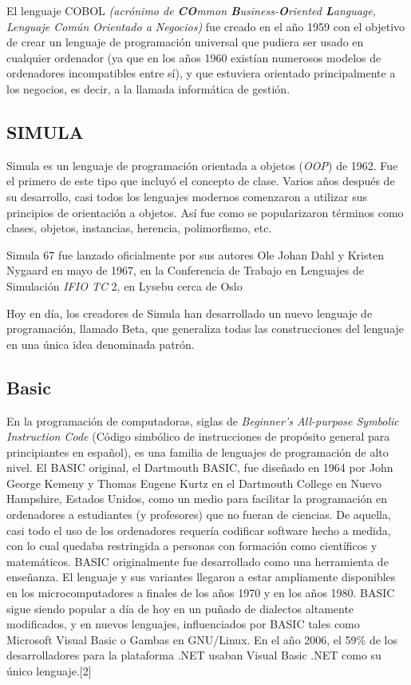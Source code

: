 \documentclass[twoside,twocolumn]{article}
\begin{document}
El lenguaje COBOL \textit{(acrónimo de \textbf{CO}mmon \textbf{B}usiness-\textbf{O}riented \textbf{L}anguage, Lenguaje Común Orientado a Negocios)} fue creado en el año 1959 con el objetivo de crear un lenguaje de programación universal que pudiera ser usado en cualquier ordenador (ya que en los años 1960 existían numerosos modelos de ordenadores incompatibles entre sí), y que estuviera orientado principalmente a los negocios, es decir, a la llamada informática de gestión.

\subsection{SIMULA}

Simula es un lenguaje de programación orientada a objetos (\textit{OOP}) de 1962. Fue el primero de este tipo que incluyó el concepto de clase. Varios años después de su desarrollo, casi todos los lenguajes modernos comenzaron a utilizar sus principios de orientación a objetos. Así fue como se popularizaron términos como clases, objetos, instancias, herencia, polimorfismo, etc.

Simula 67 fue lanzado oficialmente por sus autores Ole Johan Dahl y Kristen Nygaard en mayo de 1967, en la Conferencia de Trabajo en Lenguajes de Simulación \textit{IFIO TC }2, en Lysebu cerca de Oslo

Hoy en día, los creadores de Simula han desarrollado un nuevo lenguaje de programación, llamado Beta, que generaliza todas las construcciones del lenguaje en una única idea denominada patrón.

\subsection{Basic}

En la programación de computadoras, siglas de \textit{Beginner's All-purpose Symbolic Instruction Code} (Código simbólico de instrucciones de propósito general para principiantes en español), es una familia de lenguajes de programación de alto nivel. El BASIC original, el Dartmouth BASIC, fue diseñado en 1964 por John George Kemeny y Thomas Eugene Kurtz en el Dartmouth College en Nuevo Hampshire, Estados Unidos, como un medio para facilitar la programación en ordenadores a estudiantes (y profesores) que no fueran de ciencias. De aquella, casi todo el uso de los ordenadores requería codificar software hecho a medida, con lo cual quedaba restringida a personas con formación como científicos y matemáticos. BASIC originalmente fue desarrollado como una herramienta de enseñanza. El lenguaje y sus variantes llegaron a estar ampliamente disponibles en los microcomputadores a finales de los años 1970 y en los años 1980. BASIC sigue siendo popular a día de hoy en un puñado de dialectos altamente modificados, y en nuevos lenguajes, influenciados por BASIC tales como Microsoft\cite{microsoft} Visual Basic o Gambas en GNU/Linux\cite{gnulinux}. En el año 2006, el 59\% de los desarrolladores para la plataforma .NET usaban Visual Basic .NET como su único lenguaje.[2]
\end{document}
